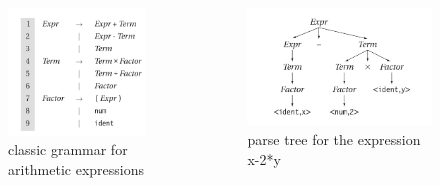 \begin{frame}
   \begin{columns}
       \begin{column}{0.4\textwidth}
           \begin{figure}
               \includegraphics[width=\textwidth]{img/cfg.png}
               \caption{classic grammar for arithmetic expressions}
           \end{figure}
       \end{column}
       \begin{column}{0.6\textwidth}
        \begin{figure}
            \includegraphics[width=\textwidth]{img/parse.png}
            \caption{parse tree for the expression x-2*y}
        \end{figure}
           
       \end{column}
   \end{columns}
\end{frame}

